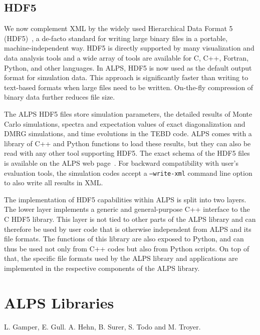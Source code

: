 \documentclass[12pt]{iopart}
\begin{document}
\subsection{HDF5}

We now complement XML by the widely used Hierarchical Data Format 5 (HDF5)~\cite{hdf5}, a de-facto standard for writing large binary files in a portable, machine-independent way. HDF5 is directly supported by many visualization and data analysis tools and a       wide array of tools are 
available for C, C++, Fortran, Python, and other languages. In ALPS, HDF5 is now used as the default output format for simulation data. This approach is significantly faster than writing to text-based formats when large files need to be written. On-the-fly compression of binary data further reduces file size. 

The ALPS HDF5 files store simulation parameters, the detailed results of Monte Carlo simulations, spectra and expectation values of exact diagonalization and DMRG simulations, and time evolutions in the TEBD code. ALPS comes with a library of C++ and Python functions to load these results, but they can also be read with any other tool supporting HDF5. The exact schema of the HDF5 files is available on the ALPS web page~\cite{alps}. For backward compatibility with user's evaluation tools, the simulation codes accept a {\tt --write-xml} command line option to also write all results in XML.

The implementation of HDF5 capabilities within ALPS is split into two layers. The lower layer implements a generic and general-purpose C++ interface to the C HDF5 library. This layer is not tied to other parts of the ALPS library and can therefore be used by user code that is otherwise independent from ALPS and its file formats. The functions of this library are also exposed to Python, and can thus be used not only from C++ codes but also from Python scripts. On top of that, the specific file formats used by the ALPS library and applications are implemented in the respective components of the ALPS library.




\section{ALPS Libraries}
 L. Gamper, E. Gull. A. Hehn, B. Surer, S. Todo and M. Troyer. 

\medskip
\end{document}
